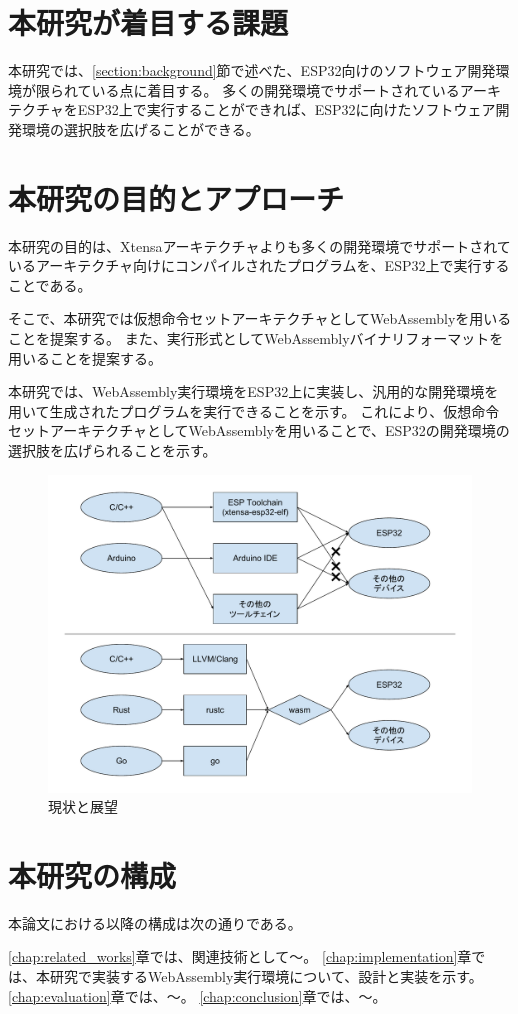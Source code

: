\section{本研究が着目する課題}

本研究では、\ref{section:background}節で述べた、ESP32向けのソフトウェア開発環境が限られている点に着目する。
多くの開発環境でサポートされているアーキテクチャをESP32上で実行することができれば、ESP32に向けたソフトウェア開発環境の選択肢を広げることができる。

\section{本研究の目的とアプローチ}

本研究の目的は、Xtensaアーキテクチャよりも多くの開発環境でサポートされているアーキテクチャ向けにコンパイルされたプログラムを、ESP32上で実行することである。

そこで、本研究では仮想命令セットアーキテクチャとしてWebAssemblyを用いることを提案する。
また、実行形式としてWebAssemblyバイナリフォーマットを用いることを提案する。

本研究では、WebAssembly実行環境をESP32上に実装し、汎用的な開発環境を用いて生成されたプログラムを実行できることを示す。
これにより、仮想命令セットアーキテクチャとしてWebAssemblyを用いることで、ESP32の開発環境の選択肢を広げられることを示す。

\begin{figure}[htbp]
  \caption{現状と展望}
  \label{fig:libwasm_arch}
  \begin{center}
    \includegraphics[bb=0 0 800 600,width=12cm]{img/new_world.pdf}
  \end{center}
\end{figure}


\section{本研究の構成}

本論文における以降の構成は次の通りである。

\ref{chap:related_works}章では、関連技術として〜。
\ref{chap:implementation}章では、本研究で実装するWebAssembly実行環境について、設計と実装を示す。
\ref{chap:evaluation}章では、〜。
\ref{chap:conclusion}章では、〜。
